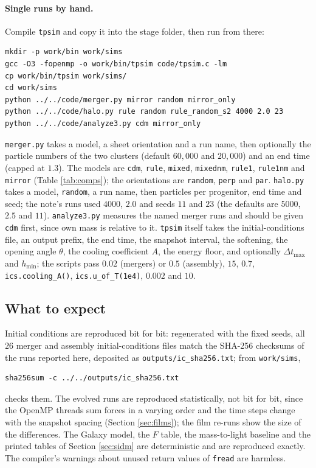 \documentclass[11pt]{article}
\theoremstyle{definition}
\newcommand{\file}[1]{\texttt{#1}}
\begin{document}
\paragraph{Single runs by hand.} Compile \file{tpsim} and copy it into the stage folder, then run from there:
{\small\begin{verbatim}
mkdir -p work/bin work/sims
gcc -O3 -fopenmp -o work/bin/tpsim code/tpsim.c -lm
cp work/bin/tpsim work/sims/
cd work/sims
python ../../code/merger.py mirror random mirror_only
python ../../code/halo.py rule random rule_random_s2 4000 2.0 23
python ../../code/analyze3.py cdm mirror_only
\end{verbatim}}
\file{merger.py} takes a model, a sheet orientation and a run name, then optionally the particle numbers of the two clusters (default $60{,}000$ and $20{,}000$) and an end time (capped at $1.3$). The models are \texttt{cdm}, \texttt{rule}, \texttt{mixed}, \texttt{mixednm}, \texttt{rule1}, \texttt{rule1nm} and \texttt{mirror} (Table \ref{tab:comps}); the orientations are \texttt{random}, \texttt{perp} and \texttt{par}. \file{halo.py} takes a model, \texttt{random}, a run name, then particles per progenitor, end time and seed; the note's runs used $4000$, $2.0$ and seeds $11$ and $23$ (the defaults are $5000$, $2.5$ and $11$). \file{analyze3.py} measures the named merger runs and should be given \texttt{cdm} first, since own mass is relative to it. \file{tpsim} itself takes the initial-conditions file, an output prefix, the end time, the snapshot interval, the softening, the opening angle $\theta$, the cooling coefficient $A$, the energy floor, and optionally $\Delta t_{\max}$ and $h_{\min}$; the scripts pass $0.02$ (mergers) or $0.5$ (assembly), $15$, $0.7$, \texttt{ics.cooling\_A()}, \texttt{ics.u\_of\_T(1e4)}, $0.002$ and $10$.

\subsection{What to expect}

Initial conditions are reproduced bit for bit: regenerated with the fixed seeds, all $26$ merger and assembly initial-conditions files match the SHA-256 checksums of the runs reported here, deposited as \file{outputs/ic\_sha256.txt}; from \file{work/sims},
{\small\begin{verbatim}
sha256sum -c ../../outputs/ic_sha256.txt
\end{verbatim}}
\noindent checks them. The evolved runs are reproduced statistically, not bit for bit, since the OpenMP threads sum forces in a varying order and the time steps change with the snapshot spacing (Section \ref{sec:films}); the film re-runs show the size of the differences. The Galaxy model, the $F$ table, the mass-to-light baseline and the printed tables of Section \ref{sec:sidm} are deterministic and are reproduced exactly. The compiler's warnings about unused return values of \texttt{fread} are harmless.
\end{document}
